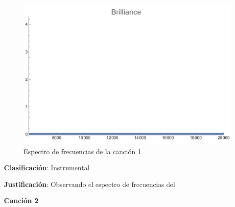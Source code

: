 \documentclass[12pt, letterpaper]{article}
\begin{document}
\begin{figure}[H]
\begin{minipage}{.3\textwidth}
  \end{minipage}
  \begin{minipage}{0.03\textwidth}\end{minipage}
  \begin{minipage}{.3\textwidth}
    \centering
    \includegraphics[width=.9\linewidth]{imgs/Cancion1/brilliance.png}
  \end{minipage}
  \caption{Espectro de frecuencias de la canción 1}
  \label{fig:esp01}
\end{figure}

\textbf{Clasificación}: Instrumental

\textbf{Justificación}: Observando el espectro de frecuencias del 

\newpage

\textbf{\large{Canción 2}}
\end{document}
